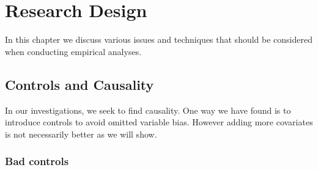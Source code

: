 \chapter{Research Design}
    In this chapter we discuss various issues and techniques that should be considered when conducting empirical analyses.

    \section{Controls and Causality}

        In our investigations, we seek to find causality. One way we have found is to introduce controls to avoid omitted variable bias. However adding more covariates is not necessarily better as we will show.

        \subsection{Bad controls}
    
